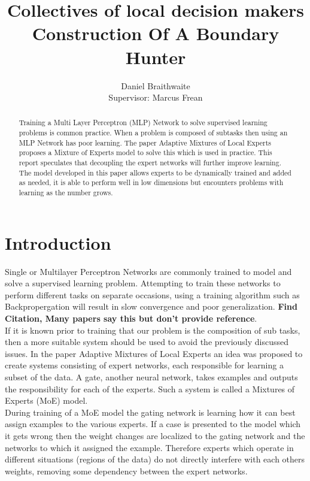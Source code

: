 \documentclass[notitlepage]{report}
\title{%
	Collectives of local decision makers\\
	\large Construction Of A Boundary Hunter
}
\author{Daniel Braithwaite\\[1cm] {Supervisor: Marcus Frean}}
\theoremstyle{definition}
\begin{document}
\begin{titlingpage}
    \maketitle
    \begin{abstract}
    	Training a Multi Layer Perceptron (MLP) Network to solve supervised learning problems is common practice. When a problem is composed of subtasks then using an MLP Network has poor learning. The paper Adaptive Mixtures of Local Experts \cite{jacobs1991adaptive} proposes a Mixture of Experts model to solve this which is used in practice. This report speculates that decoupling the expert networks will further improve learning. The model developed in this paper allows experts to be dynamically trained and added as needed, it is able to perform well in low dimensions but encounters problems with learning as the number grows.
    \end{abstract}
\end{titlingpage}

\chapter{Introduction}

Single or Multilayer Perceptron Networks are commonly trained to model and solve a supervised learning problem. Attempting to train these networks to perform different tasks on separate occasions, using a training algorithm such as Backpropergation will result in slow convergence and poor generalization. \textbf{Find Citation, Many papers say this but don't provide reference}.\\

If it is known prior to training that our problem is the composition of sub tasks, then a more suitable system should be used to avoid the previously discussed issues. In the paper Adaptive Mixtures of Local Experts \cite{jacobs1991adaptive} an idea was proposed to create systems consisting of expert networks, each responsible for learning a subset of the data. A gate, another neural network, takes examples and outputs the responsibility for each of the experts. Such a system is called a Mixtures of Experts (MoE) model.\\

During training of a MoE model the gating network is learning how it can best assign examples to the various experts. If a case is presented to the model which it gets wrong then the weight changes are localized to the gating network and the networks to which it assigned the example. Therefore experts which operate in different situations (regions of the data) do not directly interfere with each others weights, removing some dependency between the expert networks.\\
\end{document}
